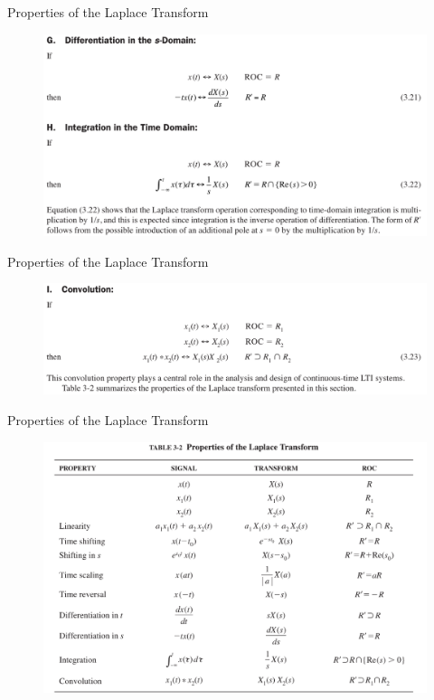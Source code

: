 \documentclass[pdflatex,compress,mathserif]{beamer}
\begin{document}
\begin{frame}{Properties of the Laplace Transform}
	\begin{figure}
		\centering
		\includegraphics[width=\linewidth]{img/img25}
	\end{figure}
\end{frame}

\begin{frame}{Properties of the Laplace Transform}
	\begin{figure}
		\centering
		\includegraphics[width=\linewidth]{img/img26}
	\end{figure}
\end{frame}

\begin{frame}{Properties of the Laplace Transform}
	\begin{figure}
		\centering
		\includegraphics[height=0.8\textheight]{img/img27}
	\end{figure}
\end{frame}
\end{document}
